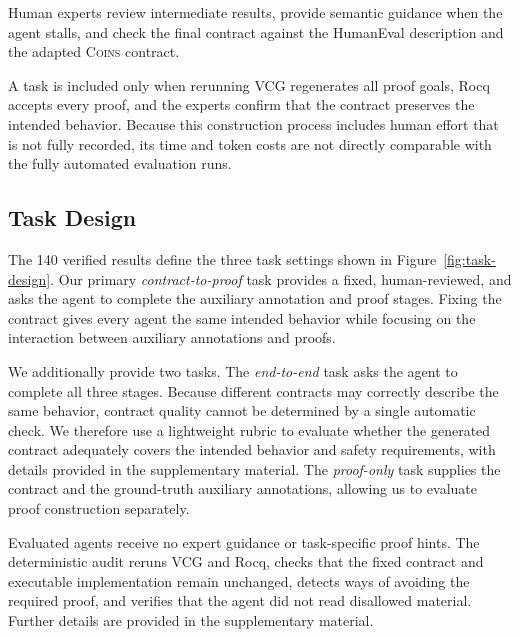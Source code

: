 Human experts review intermediate results, provide semantic guidance when the agent stalls, and check the final contract against the HumanEval description and the adapted \textsc{Coins} contract. 

A task is included only when rerunning VCG regenerates all proof goals, Rocq accepts every proof, and the experts confirm that the contract preserves the intended behavior. %
Because this construction process includes human effort that is not fully recorded, its time and token costs are not directly comparable with the fully automated evaluation runs.

\subsection{Task Design}

The 140 verified results define the three task settings shown in Figure~\ref{fig:task-design}. Our primary \emph{contract-to-proof} task provides a fixed, human-reviewed,  and asks the agent to complete the auxiliary annotation and proof stages. Fixing the contract gives every agent the same intended behavior while focusing on the interaction between auxiliary annotations and proofs.

We additionally provide two tasks. The \emph{end-to-end} task asks the agent to complete all three stages. Because different contracts may correctly describe the same behavior, contract quality cannot be determined by a single automatic check. We therefore use a lightweight rubric to evaluate whether the generated contract adequately covers the intended behavior and safety requirements, with details provided in the supplementary material. The \emph{proof-only} task supplies the  contract and the ground-truth auxiliary annotations, allowing us to evaluate proof construction separately.

Evaluated agents receive no expert guidance or task-specific proof hints. The deterministic audit reruns VCG and Rocq, checks that the fixed contract and executable implementation remain unchanged, detects ways of avoiding the required proof, and verifies that the agent did not read disallowed material. Further details are provided in the supplementary material.
